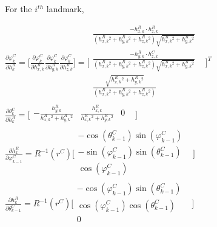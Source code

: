 For the $i^{th}$ landmark,

$\frac{\partial \varphi _{k}^{C}}{\partial h_{k}^{R}}=\lbrack 
\frac{\partial \varphi _{k}^{C}}{\partial h_{x,k}^{R}} \frac{\partial 
\varphi _{ k}^{C}}{\partial h_{y,k}^{R}} \frac{\partial \varphi _{ 
k}^{C}}{\partial h_{z,k}^{R}}\rbrack =\lbrack \begin{matrix}
\frac{-h_{x,k}^{R}\cdot 
h_{z,k}^{R}}{(h_{x,k}^{R}^{2}+h_{y,k}^{R}^{2}+h_{z,k}^{R}^{2})\sqrt{h_{x,k}^{R}^{2}+h_{y,k}^{R}^{2}}} 
& \\
\frac{-h_{y,k}^{R}\cdot 
h_{z,k}^{C}}{(h_{x,k}^{R}^{2}+h_{y,k}^{R}^{2}+h_{z,k}^{R}^{2})\sqrt{h_{x,k}^{R}^{2}+h_{y,k}^{R}^{2}}} 
& \\

\frac{\sqrt{h_{x,k}^{R}^{2}+h_{y,k}^{R}^{2}}}{(h_{x,k}^{R}^{2}+h_{y,k}^{R}^{2}+h_{z,k}^{R}^{2})} 
& \\
\end{matrix}
\rbrack ^{T}$\\


$\frac{\partial \theta _{k}^{C}}{\partial h_{k}^{R}}=\lbrack 
\begin{matrix}
-\frac{h_{y,k}^{R}}{h_{x,k}^{R}^{2}+h_{y,k}^{R}^{2}} & 
\frac{h_{x,k}^{R}}{h_{x,k}^{R}^{2}+h_{y,k}^{R}^{2}} & 0 & \\
\end{matrix}
\rbrack $\\


$\frac{\partial h_{k}^{R}}{\partial \varphi _{k-1}^{C}}=R^{-1}(r^{C}) 
\lbrack \begin{matrix}
-\cos (\theta _{k-1}^{C})\sin (\varphi _{k-1}^{C}) & \\
-\sin (\varphi _{k-1}^{C})\sin (\theta _{k-1}^{C}) & \\
\cos (\varphi _{k-1}^{C}) & \\
\end{matrix}
\rbrack $\\


$\frac{\partial h_{k}^{R}}{\partial \theta _{k-1}^{C}}=R^{-1}(r^{C}) 
\lbrack \begin{matrix}
-\cos (\varphi _{k-1}^{C})\sin (\theta _{k-1}^{C}) & \\
\cos (\varphi _{k-1}^{C})\cos (\theta _{k-1}^{C}) & \\
0 & \\
\end{matrix}
\rbrack $\\
